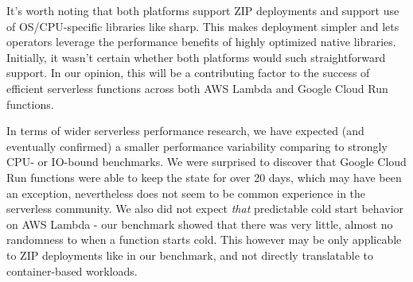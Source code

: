 It's worth noting that both platforms support ZIP deployments and support use of OS/CPU-specific libraries like sharp. This makes deployment simpler and lets operators leverage the performance benefits of highly optimized native libraries. Initially, it wasn't certain whether both platforms would such straightforward support. In our opinion, this will be a contributing factor to the success of efficient serverless functions across both AWS Lambda and Google Cloud Run functions.

In terms of wider serverless performance research, we have expected (and eventually confirmed) a smaller performance variability comparing to strongly CPU- or IO-bound benchmarks. We were surprised to discover that Google Cloud Run functions were able to keep the state for over 20 days, which may have been an exception, nevertheless does not seem to be common experience in the serverless community. We also did not expect \emph{that} predictable cold start behavior on AWS Lambda - our benchmark showed that there was very little, almost no randomness to when a function starts cold. This however may be only applicable to ZIP deployments like in our benchmark, and not directly translatable to container-based workloads.

